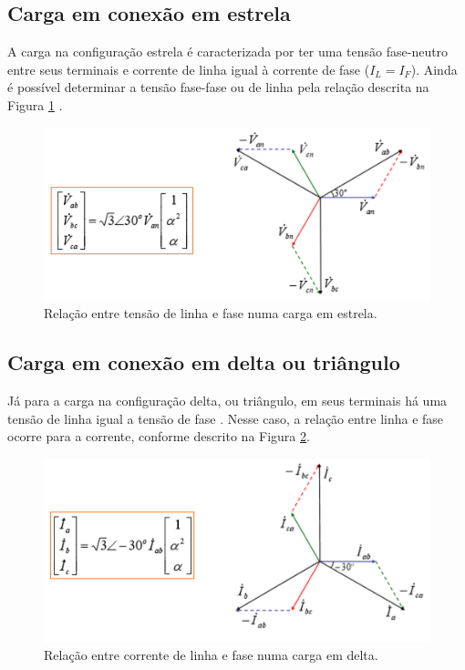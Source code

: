 \documentclass[a4paper,12pt,oneside,openany,table,xcdraw]{article}
\begin{document}
\subsection{Carga em conexão em estrela} \label{estrela}
A carga na configuração estrela é caracterizada por ter uma tensão fase-neutro entre seus terminais e corrente de linha igual à corrente de fase ($I_L=I_F$). Ainda é possível determinar a tensão fase-fase ou de linha pela relação descrita na Figura \ref{carga-estrela} \cite{irwin}. 
\begin{figure}[H]
\centering
\captionsetup{font=scriptsize}
\includegraphics[width=14.5cm]{carga-estrela}
\caption{Relação entre tensão de linha e fase numa carga em estrela.}
\label{carga-estrela}
\end{figure}

\subsection{Carga em conexão em delta ou triângulo} \label{delta}
Já para a carga na configuração delta, ou triângulo, em seus terminais há uma tensão de linha igual a tensão de fase \cite{irwin}. Nesse caso, a relação entre linha e fase ocorre para a corrente, conforme descrito na Figura \ref{carga-delta}.
\begin{figure}[H]
\centering
\captionsetup{font=scriptsize}
\includegraphics[width=14.5cm]{carga-delta}
\caption{Relação entre corrente de linha e fase numa carga em delta.}
\label{carga-delta}
\end{figure}
\end{document}
